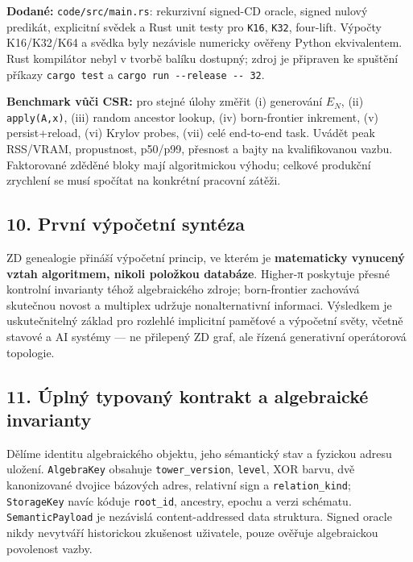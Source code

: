\documentclass[
  10pt,
]{article}
\begin{document}
\textbf{Dodané:} \texttt{code/src/main.rs}: rekurzivní signed-CD oracle,
signed nulový predikát, explicitní svědek a Rust unit testy pro
\texttt{K16}, \texttt{K32}, four-lift. Výpočty K16/K32/K64 a svědka byly
nezávisle numericky ověřeny Python ekvivalentem. Rust kompilátor nebyl v
tvorbě balíku dostupný; zdroj je připraven ke spuštění příkazy
\texttt{cargo\ test} a \texttt{cargo\ run\ -\/-release\ -\/-\ 32}.

\textbf{Benchmark vůči CSR:} pro stejné úlohy změřit (i) generování
\(E_N\), (ii) \texttt{apply(A,x)}, (iii) random ancestor lookup, (iv)
born-frontier inkrement, (v) persist+reload, (vi) Krylov probes, (vii)
celé end-to-end task. Uvádět peak RSS/VRAM, propustnost, p50/p99,
přesnost a bajty na kvalifikovanou vazbu. Faktorované zděděné bloky mají
algoritmickou výhodu; celkové produkční zrychlení se musí spočítat na
konkrétní pracovní zátěži.

\subsection{10. První výpočetní
syntéza}\label{prvnuxed-vuxfdpoux10detnuxed-syntuxe9za}

ZD genealogie přináší výpočetní princip, ve kterém je
\textbf{matematicky vynucený vztah algoritmem, nikoli položkou
databáze}. Higher-π poskytuje přesné kontrolní invarianty téhož
algebraického zdroje; born-frontier zachovává skutečnou novost a
multiplex udržuje nonalternativní informaci. Výsledkem je uskutečnitelný
základ pro rozlehlé implicitní paměťové a výpočetní světy, včetně
stavové a AI systémy --- ne přilepený ZD graf, ale řízená generativní
operátorová topologie.

\subsection{11. Úplný typovaný kontrakt a algebraické
invarianty}\label{uxfaplnuxfd-typovanuxfd-kontrakt-a-algebraickuxe9-invarianty}

Dělíme identitu algebraického objektu, jeho sémantický stav a fyzickou
adresu uložení. \texttt{AlgebraKey} obsahuje \texttt{tower\_version},
\texttt{level}, XOR barvu, dvě kanonizované dvojice bázových adres,
relativní sign a \texttt{relation\_kind}; \texttt{StorageKey} navíc
kóduje \texttt{root\_id}, ancestry, epochu a verzi schématu.
\texttt{SemanticPayload} je nezávislá content-addressed data struktura.
Signed oracle nikdy nevytváří historickou zkušenost uživatele, pouze
ověřuje algebraickou povolenost vazby.
\end{document}
